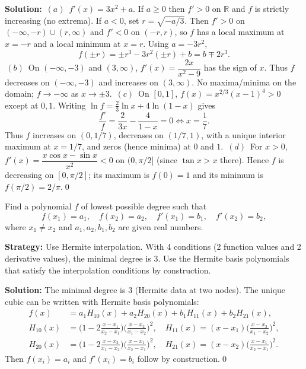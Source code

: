 \bigskip\noindent\textbf{Solution:}
\(\,(a)\,\) $f'(x)=3x^2+a$. If $a\ge 0$ then $f'>0$ on $\mathbb{R}$ and $f$ is strictly increasing (no extrema). If $a<0$, set $r=\sqrt{-a/3}$. Then $f'>0$ on $(-\infty,-r)\cup(r,\infty)$ and $f'<0$ on $(-r,r)$, so $f$ has a local maximum at $x=-r$ and a local minimum at $x=r$. Using $a=-3r^2$,
\[f(\pm r)=\pm r^3-3r^2(\pm r)+b=b\mp 2r^3.\]
\(\,(b)\,\) On $(-\infty,-3)$ and $(3,\infty)$, $f'(x)=\dfrac{2x}{x^2-9}$ has the sign of $x$. Thus $f$ decreases on $(-\infty,-3)$ and increases on $(3,\infty)$. No maxima/minima on the domain; $f\to-\infty$ as $x\to\pm3$.\newline
\(\,(c)\,\) On $[0,1]$, $f(x)=x^{2/3}(x-1)^4>0$ except at $0,1$. Writing $\ln f=\tfrac23\ln x+4\ln(1-x)$ gives
\[\frac{f'}{f}=\frac{2}{3x}-\frac{4}{1-x}=0\iff x=\frac17.\]
Thus $f$ increases on $(0,1/7)$, decreases on $(1/7,1)$, with a unique interior maximum at $x=1/7$, and zeros (hence minima) at $0$ and $1$.\newline
\(\,(d)\,\) For $x>0$, $f'(x)=\dfrac{x\cos x-\sin x}{x^2}<0$ on $(0,\pi/2]$ (since $\tan x> x$ there). Hence $f$ is decreasing on $[0,\pi/2]$; its maximum is $f(0)=1$ and its minimum is $f(\pi/2)=2/\pi$.\qed


\begin{problembox}
Find a polynomial \( f \) of lowest possible degree such that
\[ f(x_1) = a_1, \quad f(x_2) = a_2, \quad f'(x_1) = b_1, \quad f'(x_2) = b_2, \]
where \( x_1 \neq x_2 \) and \( a_1, a_2, b_1, b_2 \) are given real numbers.
\end{problembox}

\noindent\textbf{Strategy:} Use Hermite interpolation. With 4 conditions (2 function values and 2 derivative values), the minimal degree is 3. Use the Hermite basis polynomials that satisfy the interpolation conditions by construction.

\bigskip\noindent\textbf{Solution:}
The minimal degree is \textbf{$3$} (Hermite data at two nodes). The unique cubic can be written with Hermite basis polynomials:
\[\begin{aligned}
f(x)&=a_1 H_{10}(x)+a_2 H_{20}(x)+b_1 H_{11}(x)+b_2 H_{21}(x),\\
H_{10}(x)&=\Big(1-2\frac{x-x_1}{x_2-x_1}\Big)\Big(\frac{x-x_2}{x_1-x_2}\Big)^2,\quad H_{11}(x)=(x-x_1)\Big(\frac{x-x_2}{x_1-x_2}\Big)^2,\\
H_{20}(x)&=\Big(1-2\frac{x-x_2}{x_1-x_2}\Big)\Big(\frac{x-x_1}{x_2-x_1}\Big)^2,\quad H_{21}(x)=(x-x_2)\Big(\frac{x-x_1}{x_2-x_1}\Big)^2.
\end{aligned}\]
Then $f(x_i)=a_i$ and $f'(x_i)=b_i$ follow by construction.\qed


